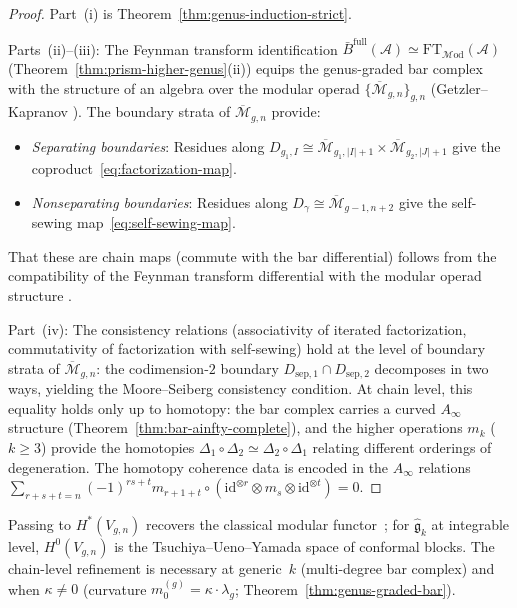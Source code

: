 \begin{proof}
Part~(i) is Theorem~\ref{thm:genus-induction-strict}.

Parts~(ii)--(iii): The Feynman transform identification
$\bar{B}^{\mathrm{full}}(\mathcal{A}) \simeq
\mathrm{FT}_{\mathcal{M}\mathrm{od}}(\mathcal{A})$
(Theorem~\ref{thm:prism-higher-genus}(ii)) equips the genus-graded
bar complex with the structure of an algebra over the modular operad
$\{\overline{\mathcal{M}}_{g,n}\}_{g,n}$ (Getzler--Kapranov
\cite{GeK98}).  The boundary strata of $\overline{\mathcal{M}}_{g,n}$
provide:
\begin{itemize}
\item \emph{Separating boundaries}: Residues along
  $D_{g_1,I} \cong \overline{\mathcal{M}}_{g_1,|I|+1}
  \times \overline{\mathcal{M}}_{g_2,|J|+1}$ give the
  coproduct~\eqref{eq:factorization-map}.
\item \emph{Nonseparating boundaries}: Residues along
  $D_\gamma \cong \overline{\mathcal{M}}_{g-1,n+2}$ give the
  self-sewing map~\eqref{eq:self-sewing-map}.
\end{itemize}
That these are chain maps (commute with the bar differential)
follows from the compatibility of the Feynman transform differential
with the modular operad structure \cite[Theorem~5.4]{GeK98}.

Part~(iv): The consistency relations (associativity of
iterated factorization, commutativity of factorization with
self-sewing) hold at the level of boundary strata of
$\overline{\mathcal{M}}_{g,n}$: the codimension-$2$ boundary
$D_{\mathrm{sep},1} \cap D_{\mathrm{sep},2}$ decomposes in two
ways, yielding the Moore--Seiberg consistency condition.  At chain
level, this equality holds only up to homotopy: the bar complex
carries a curved $A_\infty$ structure
(Theorem~\ref{thm:bar-ainfty-complete}), and the higher
operations $m_k$ ($k \geq 3$) provide the homotopies
$\Delta_1 \circ \Delta_2 \simeq \Delta_2 \circ \Delta_1$
relating different orderings of degeneration.  The homotopy
coherence data is encoded in the $A_\infty$ relations
$\sum_{r+s+t=n} (-1)^{rs+t} m_{r+1+t} \circ
(\mathrm{id}^{\otimes r} \otimes m_s \otimes
\mathrm{id}^{\otimes t}) = 0$.
\end{proof}

\begin{remark}
\label{rem:chain-vs-classical-mf}
Passing to $H^*(V_{g,n})$ recovers the classical modular functor~\cite{BK01}; for $\widehat{\mathfrak{g}}_k$ at integrable level, $H^0(V_{g,n})$ is the Tsuchiya--Ueno--Yamada space of conformal blocks.  The chain-level refinement is necessary at generic~$k$ (multi-degree bar complex) and when $\kappa \neq 0$ (curvature $m_0^{(g)} = \kappa \cdot \lambda_g$; Theorem~\ref{thm:genus-graded-bar}).
\end{remark}

